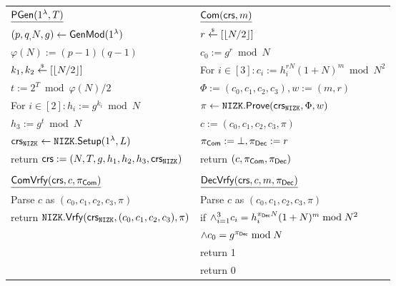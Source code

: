\begin{figure}[h!]
\begin{center}
\begin{tabular}{|ll|}
\hline
$\underline{\mathsf{PGen}(1{^{\lambda}}, T)}$ 							   & $\underline{\mathsf{Com}(\mathsf{crs}, m)}$ \\
$(p, q_, N, g) \leftarrow \mathsf{GenMod}(1{^{\lambda}})$ & $r \stackrel{{\scriptscriptstyle\$}}{\leftarrow} [\left\lfloor N/2 \right\rfloor]$  \\
$\varphi(N):= (p-1)(q-1)$   & $c_0:= g^r \bmod N$ \\
$k_1, k_2 \stackrel{{\scriptscriptstyle\$}}{\leftarrow} [\left\lfloor N/2 \right\rfloor]$ & For $i \in [3]: c_i:= h_i^{rN}(1+N)^m \bmod N^2$\\
$t:= 2^T \bmod \varphi(N)/2$ & $\Phi := (c_0, c_1, c_2, c_3), w := (m, r)$ \\
For $i \in [2]: h_i:= g^{k_i} \bmod N$ &  $\pi \leftarrow \mathtt{NIZK}.\mathsf{Prove}(\mathsf{crs}_{\mathtt{NIZK}}, \Phi, w)$\\
$h_3:=g^{t} \bmod N$ &  $c := (c_0, c_1, c_2, c_3, \pi)$\\
$\mathsf{crs}_{\mathtt{NIZK}} \leftarrow \mathtt{NIZK}.\mathsf{Setup}(1{^{\lambda}}, L)$ &  $\pi_{\mathsf{Com}}:= \bot, \pi_{\mathsf{Dec}}: = r$ \\
return $\mathsf{crs}:= (N,T,g,h_1,h_2, h_3, \mathsf{crs}_{\mathtt{NIZK}})$ & return $(c, \pi_{\mathsf{Com}}, \pi_{\mathsf{Dec}})$\\
                                             &\\
$\underline{\mathsf{ComVrfy}(\mathsf{crs}, c, \pi_{\mathsf{Com}})}$     & $\underline{\mathsf{DecVrfy}(\mathsf{crs},c, m, \pi_{\mathsf{Dec}})}$ \\
Parse $c$ as $(c_0, c_1, c_2, c_3, \pi)$  & Parse $c$ as $(c_0, c_1, c_2, c_3, \pi)$ \\
return $\mathtt{NIZK}.\mathsf{Vrfy}(\mathsf{crs}_{\mathtt{NIZK}}, (c_0, c_1, c_2, c_3), \pi)$  & if $ \land_{i=1}^3 c_i = h_i^{\pi_{\mathsf{Dec}} N}(1+N)^m  \bmod N^2$ \\
								& $\land c_0 = g^{\pi_{\mathsf{Dec}}} \bmod N$\\
								 & \tab return 1 	\\
& return 0 \\


\end{tabular}
\end{center}
\end{figure}
